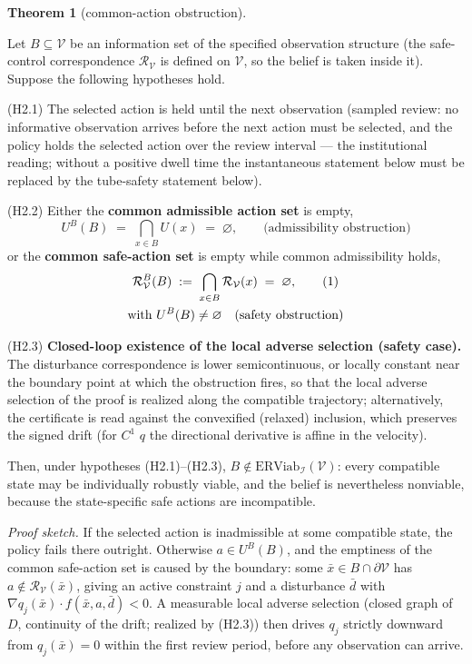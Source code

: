 \documentclass[10pt,twocolumn]{article}
\theoremstyle{definition}
\newtheorem{theorem}{Theorem}
\begin{document}
\begin{theorem}[common-action obstruction]\label{calc-thm:common-action}

Let \(B \subseteq \mathcal{V}\) be an information set of the specified observation structure (the safe-control correspondence
\(\mathcal{R}_{\mathcal{V}}\) is defined on \(\mathcal{V}\), so the
belief is taken inside it). Suppose the following hypotheses hold.

(H2.1) The selected action is held until the next observation (sampled
review: no informative observation arrives before the next action must
be selected, and the policy holds the selected action over the review
interval --- the institutional reading; without a positive dwell time
the instantaneous statement below must be replaced by the tube-safety statement below).

(H2.2) Either the \textbf{common admissible action set} is empty,
\[U^B(B) \;=\; \bigcap_{x \in B} U(x) \;=\; \varnothing, \qquad \text{(admissibility obstruction)}\]
or the \textbf{common safe-action set} is empty while common
admissibility holds,
\begin{gather}
\mathcal{R}_{\mathcal{V}}^B(B) \;:=\; \bigcap_{x \in B} \mathcal{R}_{\mathcal{V}}(x) \;=\; \varnothing, \tag{1}\\
\text{with } U^B(B) \neq \varnothing \quad \text{(safety obstruction)} \notag
\end{gather}

(H2.3) \textbf{Closed-loop existence of the local adverse selection
(safety case).} The disturbance correspondence is lower semicontinuous,
or locally constant near the boundary point at which the obstruction
fires, so that the local adverse selection of the proof is realized
along the compatible trajectory; alternatively, the certificate is read
against the convexified (relaxed) inclusion, which preserves the
signed drift (for \(C^1\) \(q\) the directional derivative is affine in the velocity).

Then, under hypotheses (H2.1)--(H2.3),
\(B \notin \mathrm{ERViab}_{\mathcal{I}}(\mathcal{V})\): every
compatible state may be individually robustly viable, and the belief is
nevertheless nonviable, because the state-specific safe actions are
incompatible.

\end{theorem}

\emph{Proof sketch.} If the selected action is inadmissible at some compatible state, the policy fails there outright. Otherwise \(a \in U^B(B)\), and the emptiness of the common safe-action set is caused by the boundary: some \(\bar x \in B \cap \partial\mathcal{V}\) has \(a \notin \mathcal{R}_{\mathcal{V}}(\bar x)\), giving an active constraint \(j\) and a disturbance \(\bar d\) with \(\nabla q_j(\bar x) \cdot f(\bar x, a, \bar d) < 0\). A measurable local adverse selection (closed graph of \(D\), continuity of the drift; realized by (H2.3)) then drives \(q_j\) strictly downward from \(q_j(\bar x) = 0\) within the first review period, before any observation can arrive.
\end{document}
